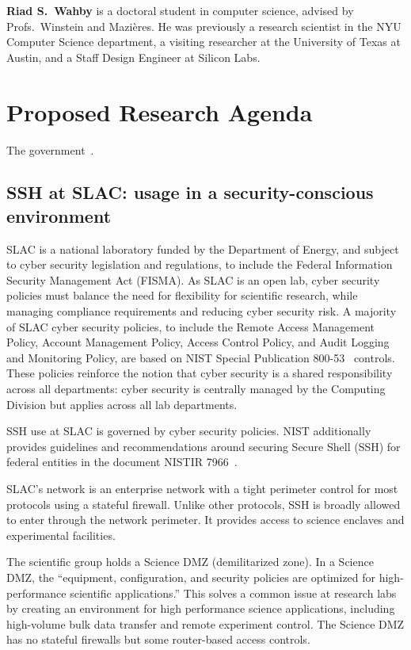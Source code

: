 \documentclass[11pt]{article}
\newcommand{\slim}{\vspace{\baselineskip}}
\begin{document}
\slim

\noindent \textbf{Riad S.~Wahby} is a doctoral student in computer science,
advised by Profs.~Winstein and Mazi\`{e}res. He was previously a
research scientist in the NYU Computer Science department, a
visiting researcher at the University of Texas at Austin, and a Staff
Design Engineer at Silicon Labs.

\section{Proposed Research Agenda}

The government~\cite{cyberframework, nistSSH, trumpeo}.

\subsection{SSH at SLAC: usage in a security-conscious environment}

SLAC is a national laboratory funded by the Department of Energy, and
subject to cyber security legislation and regulations, to include the
Federal Information Security Management Act (FISMA). As SLAC is an
open lab, cyber security policies must balance the need for
flexibility for scientific research, while managing compliance
requirements and reducing cyber security risk. A majority of SLAC
cyber security policies, to include the Remote Access Management
Policy, Account Management Policy, Access Control Policy, and Audit
Logging and Monitoring Policy, are based on NIST Special Publication
800-53~\cite{nist80053} controls. These policies reinforce the notion
that cyber security is a shared responsibility across all departments:
cyber security is centrally managed by the Computing Division but
applies across all lab departments.

SSH use at SLAC is governed by cyber security policies. NIST
additionally provides guidelines and recommendations around securing
Secure Shell (SSH) for federal entities in the document NISTIR
7966~\cite{nistSSH}.

SLAC's network is an enterprise network with a tight perimeter control
for most protocols using a stateful firewall. Unlike other protocols,
SSH is broadly allowed to enter through the network perimeter. It
provides access to science enclaves and experimental facilities.

The scientific group holds a Science DMZ (demilitarized zone). In a
Science DMZ, the ``equipment, configuration, and security policies are
optimized for high-performance scientific applications.'' This solves
a common issue at research labs by creating an environment for high
performance science applications, including high-volume bulk data
transfer and remote experiment control. The Science DMZ has no
stateful firewalls but some router-based access controls.
\end{document}
